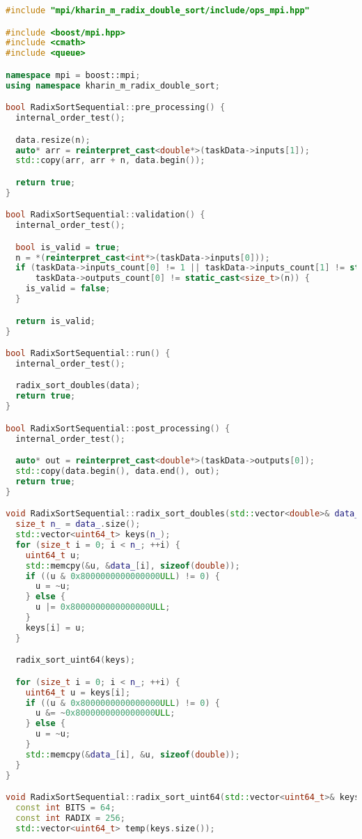\documentclass[a4paper,12pt]{article}
\begin{document}
\begin{lstlisting}[language=C++, caption={Реализация параллельной поразрядной сортировки с использованием MPI}]
#include "mpi/kharin_m_radix_double_sort/include/ops_mpi.hpp"

#include <boost/mpi.hpp>
#include <cmath>
#include <queue>

namespace mpi = boost::mpi;
using namespace kharin_m_radix_double_sort;

bool RadixSortSequential::pre_processing() {
  internal_order_test();

  data.resize(n);
  auto* arr = reinterpret_cast<double*>(taskData->inputs[1]);
  std::copy(arr, arr + n, data.begin());

  return true;
}

bool RadixSortSequential::validation() {
  internal_order_test();

  bool is_valid = true;
  n = *(reinterpret_cast<int*>(taskData->inputs[0]));
  if (taskData->inputs_count[0] != 1 || taskData->inputs_count[1] != static_cast<size_t>(n) ||
      taskData->outputs_count[0] != static_cast<size_t>(n)) {
    is_valid = false;
  }

  return is_valid;
}

bool RadixSortSequential::run() {
  internal_order_test();

  radix_sort_doubles(data);
  return true;
}

bool RadixSortSequential::post_processing() {
  internal_order_test();

  auto* out = reinterpret_cast<double*>(taskData->outputs[0]);
  std::copy(data.begin(), data.end(), out);
  return true;
}

void RadixSortSequential::radix_sort_doubles(std::vector<double>& data_) {
  size_t n_ = data_.size();
  std::vector<uint64_t> keys(n_);
  for (size_t i = 0; i < n_; ++i) {
    uint64_t u;
    std::memcpy(&u, &data_[i], sizeof(double));
    if ((u & 0x8000000000000000ULL) != 0) {
      u = ~u;
    } else {
      u |= 0x8000000000000000ULL;
    }
    keys[i] = u;
  }

  radix_sort_uint64(keys);

  for (size_t i = 0; i < n_; ++i) {
    uint64_t u = keys[i];
    if ((u & 0x8000000000000000ULL) != 0) {
      u &= ~0x8000000000000000ULL;
    } else {
      u = ~u;
    }
    std::memcpy(&data_[i], &u, sizeof(double));
  }
}

void RadixSortSequential::radix_sort_uint64(std::vector<uint64_t>& keys) {
  const int BITS = 64;
  const int RADIX = 256;
  std::vector<uint64_t> temp(keys.size());


\end{lstlisting}
\end{document}

